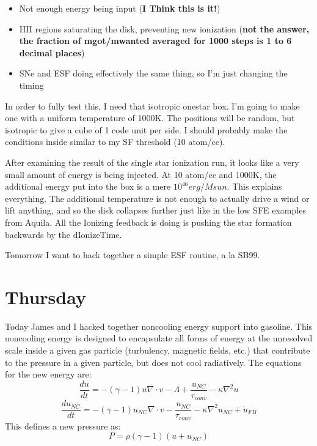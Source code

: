\documentclass[11pt,letterpaper]{article}
\begin{document}
\begin{itemize}
\item
  Not enough energy being input (\textbf{I Think this is it!})
\item
  HII regions saturating the disk, preventing new ionization
  (\textbf{not the answer, the fraction of mgot/mwanted averaged for
  1000 steps is 1 to 6 decimal places})
\item
  SNe and ESF doing effectively the same thing, so I'm just changing the
  timing
\end{itemize}

In order to fully test this, I need that isotropic onestar box. I'm
going to make one with a uniform temperature of 1000K. The positions
will be random, but isotropic to give a cube of 1 code unit per side. I
should probably make the conditions inside similar to my SF threshold
(10 atom/cc).

After examining the result of the single star ionization run, it looks
like a very small amount of energy is being injected. At 10 atom/cc and
1000K, the additional energy put into the box is a mere
$10^{46} erg/Msun$. This explains everything. The additional temperature
is not enough to actually drive a wind or lift anything, and so the disk
collapses further just like in the low SFE examples from Aquila. All the
Ionizing feedback is doing is pushing the star formation backwards by
the dIonizeTime.

Tomorrow I want to hack together a simple ESF routine, a la SB99.

\section{Thursday}

Today James and I hacked together noncooling energy support into
gasoline. This noncooling energy is designed to encapsulate all forms of
energy at the unresolved scale inside a given gas particle (turbulency,
magnetic fields, etc.) that contribute to the pressure in a given
particle, but does not cool radiatively. The equations for the new
energy are: \[\frac{du}{dt} = -(\gamma-1)u\nabla\cdot v - \Lambda + 
\frac{u_{NC}}{\tau_{conv}} - \kappa\nabla^2 u\]
\[\frac{du_{NC}}{dt} = -(\gamma-1)u_{NC}\nabla\cdot v - \frac{u_{NC}}{\tau_{conv}} 
- \kappa\nabla^2 u_{NC} + \dot u_{FB}\] This defines a new pressure as:
\[P = \rho(\gamma-1)(u+u_{NC})\]
\end{document}

